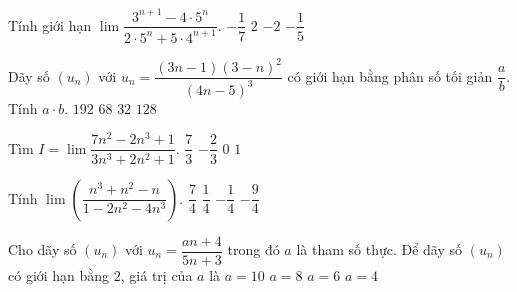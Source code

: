 \begin{ex}%
	Tính giới hạn $\lim\dfrac{3^{n+1}-4\cdot 5^n}{2\cdot 5^n+5\cdot  4^{n+1}}$.
	\choice 
		{$-\dfrac{1}{7}$} 
		{$2$} 
		{\True $-2$} 
		{$-\dfrac{1}{5}$} 
\end{ex}

\begin{ex}%
	Dãy số $(u_n)$ với $u_n=\dfrac{\left(3n-1\right)\left(3-n\right)^2}{\left(4n-5\right)^3}$ có giới hạn  bằng phân số tối giản $\dfrac{a}{b}$. Tính $a\cdot b$.
	\choice 
		 {\True $192$}
		{$68$} 
		 {$32$}
		 {$128$}
\end{ex}

\begin{ex}%
	 Tìm $I=\lim\dfrac{7{n^2}-2{n^3}+1}{3{n^3}+2{n^2}+1}$.
	\choice 
		{$\dfrac  {7}{3}$}
		{\True  $-\dfrac {2}{3}$}
		 {$0$}
		{$1$} 
\end{ex}

\begin{ex}%
	Tính $\lim  \left(\dfrac{n^3+n^2-n}{1-2n^2-4n^3}\right)$.
	\choice 
		 {$\dfrac{7}{4}$}
		{$\dfrac{1}{4}$} 
		{\True$-\dfrac{1}{4}$} 
		 {$-\dfrac{9}{4}$}
\end{ex}

\begin{ex}%
	Cho dãy số $\left({u_n} \right)$ với  ${u_n}=\dfrac{an+4}{5n+3}$
	trong đó $a$ là tham số thực. Để dãy số $\left({u_n} \right)$ có giới hạn bằng $2$, giá trị của $a$  là
	 \choice
		 {\True $a=10$}
		{$a=8$} 
		 {$a=6$}
		{$a=4$} 
\end{ex}

